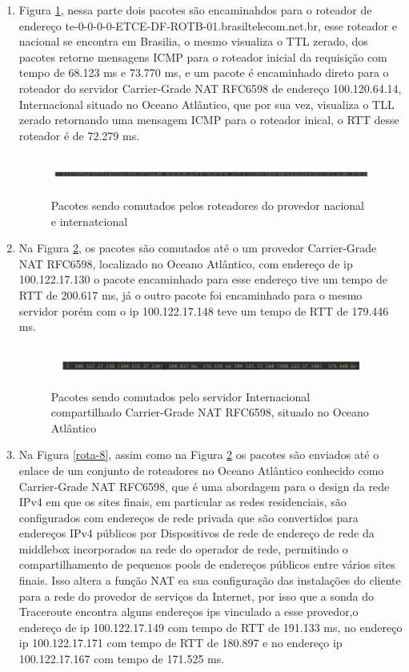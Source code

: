 \documentclass[
	article,			%
	11pt,				%
	oneside,			%
	a4paper,			%
	english,			%
	brazil,				%
	sumario=tradicional
	]{abntex2}
\begin{document}
\begin{enumerate}
		\item 
		Figura \ref{rota-6}, nessa parte dois pacotes são encaminahdos para o roteador de endereço te-0-0-0-0-ETCE-DF-ROTB-01.brasiltelecom.net.br, esse roteador e nacional se encontra em Brasilia, o mesmo visualiza o TTL zerado, dos pacotes retorne mensagens ICMP para o roteador inicial da requisição com tempo de 68.123 ms e 73.770 ms, e um pacote é encaminhado direto para o roteador do servidor Carrier-Grade NAT RFC6598 de endereço 100.120.64.14, Internacional situado no Oceano Atlântico, que por sua vez, visualiza o TLL zerado retornando uma mensagem ICMP para o roteador inical, o RTT desse roteador é de 72.279 ms.
	
	\begin{figure}[H]
		\centering
		\includegraphics[width=17cm,height=1.3cm]{./rota-6.png}
		\caption{Pacotes sendo comutados pelos roteadores do provedor nacional e internatcional}
		\label{rota-6}
	\end{figure}

		\item Na Figura \ref{rota-7}, os pacotes são comutados até o um provedor Carrier-Grade NAT RFC6598, localizado no Oceano Atlântico, com endereço de ip 100.122.17.130 o pacote encaminhado para esse endereço tive um tempo de RTT de 200.617 ms, já o outro pacote foi encaminhado para o mesmo servidor porém com o ip  100.122.17.148 teve um tempo de RTT de 179.446 ms.  
	
	\begin{figure}[H]
		\centering
		\includegraphics[width=17cm,height=1.3cm]{./rota-7.png}
		\caption{Pacotes sendo comutados pelo servidor Internacional compartilhado Carrier-Grade NAT RFC6598, situado no Oceano Atlântico}
		\label{rota-7}
	\end{figure}
	 	
	 	\item Na Figura \ref{rota-8}, assim como na Figura \ref{rota-7} os pacotes são enviados até o enlace de um conjunto de roteadores no Oceano Atlântico conhecido como Carrier-Grade NAT RFC6598, que é uma abordagem para o design da rede IPv4 em que os sites finais, em particular as redes residenciais, são configurados com endereços de rede privada que são convertidos para endereços IPv4 públicos por Dispositivos de rede de endereço de rede da middlebox incorporados na rede do operador de rede, permitindo o compartilhamento de pequenos pools de endereços públicos entre vários sites finais. Isso altera a função NAT ea sua configuração das instalações do cliente para a rede do provedor de serviços da Internet, por isso que a sonda do Traceroute encontra alguns endereços ips vinculado a esse provedor,o endereço de ip 100.122.17.149 com tempo de RTT de 191.133 ms, no endereço ip 100.122.17.171 com tempo de RTT de 180.897 e no endereço ip 100.122.17.167 com tempo de 171.525 ms.\cite{kuarsingh2014carrier}
	 	

\end{enumerate}
\end{document}
